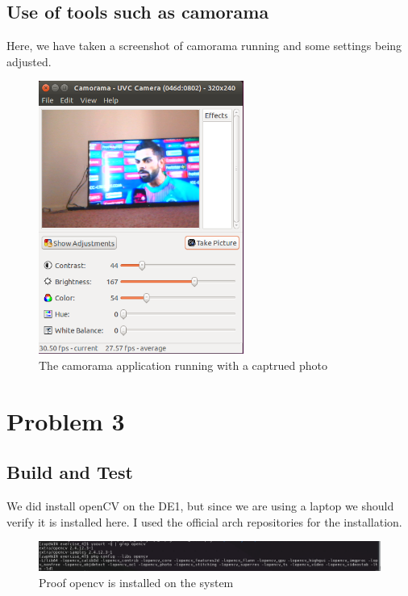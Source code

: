 \documentclass{article}
\begin{document}
\subsection*{Use of tools such as camorama}
Here, we have taken a screenshot of camorama running and some settings being adjusted.
\begin{figure}[H]
    \centering
    \includegraphics[width=0.6\textwidth]{Q2.png}
    \caption{The camorama application running with a captrued photo}
\end{figure}

\section*{Problem 3}
\subsection*{Build and Test}
We did install openCV on the DE1, but since we are using a laptop we should verify it is installed here. I used the official arch repositories for the installation.
\begin{figure}[H]
    \centering
    \includegraphics[width=\textwidth]{opencv_installed.png}
    \caption{Proof opencv is installed on the system}
\end{figure}
\end{document}
